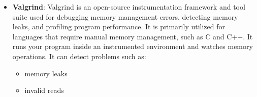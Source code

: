 \documentclass{report}
\begin{document}
\begin{itemize}
\begin{bashcode}
                \end{bashcode}
                \bigbreak \noindent 
                Often you combine the two:
                \bigbreak \noindent 
                \begin{bashcode}
                gcc -00 -fsanitize=leak,address main.c -o main
                \end{bashcode}
                \bigbreak \noindent 
                \begin{bashcode}
                -fno-omit-frame-pointer
                \end{bashcode}
                \bigbreak \noindent 
                This tells the compiler: Do not remove the frame pointer register from generated function calls.
                \bigbreak \noindent 
                The frame pointer helps debugging tools reconstruct the call stack accurately. Without it, optimized code may be faster, but stack traces can become less reliable or harder to read. With it, tools like AddressSanitizer, LeakSanitizer, Valgrind, gdb, and profilers can usually show cleaner backtraces.
                \bigbreak \noindent 
                \begin{bashcode}
                gcc -g -O0 -fsanitize=address,leak -fno-omit-frame-pointer main.c -o main
                \end{bashcode}
                \bigbreak \noindent 
                This helps produce output like:
                \bigbreak \noindent 
            \item \textbf{Valgrind}: Valgrind is an open-source instrumentation framework and tool suite used for debugging memory management errors, detecting memory leaks, and profiling program performance. It is primarily utilized for languages that require manual memory management, such as C and C++.
                \bigbreak \noindent 
                It runs your program inside an instrumented environment and watches memory operations. It can detect problems such as:
                \bigbreak \noindent 
                \begin{itemize}
                    \item memory leaks
                    \item invalid reads

\end{itemize}
\end{itemize}
\end{document}
